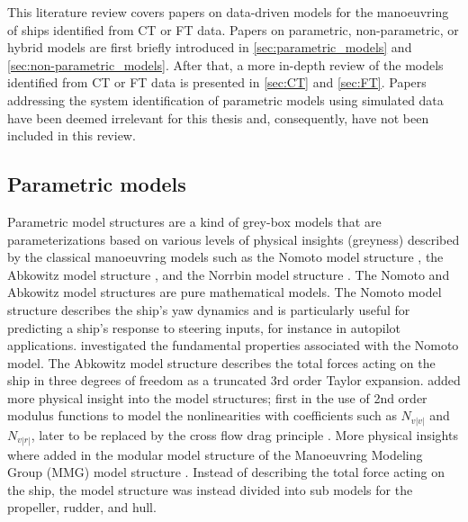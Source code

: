 This literature review covers papers on data-driven models for the manoeuvring of ships identified from CT or FT data. Papers on parametric, non-parametric, or hybrid models are first briefly introduced in \autoref{sec:parametric_models} and \ref{sec:non-parametric_models}. After that, a more in-depth review of the models identified from CT or FT data is presented in \autoref{sec:CT} and \ref{sec:FT}.
Papers addressing the system identification of parametric models using simulated data have been deemed irrelevant for this thesis and, consequently, have not been included in this review.

\subsection{Parametric models} \label{sec:parametric_models}
Parametric model structures are a kind of grey-box models that are parameterizations based on various levels of physical insights (greyness) described by the classical manoeuvring models such as the Nomoto model structure \cite{nomotoSteeringQualitiesShips1957}, the Abkowitz model structure \cite{abkowitzShipHydrodynamicsSteering1964}, and the Norrbin model structure \cite{norrbinTheoryObservationsUse1971}. The Nomoto and Abkowitz model structures are pure mathematical models. The Nomoto model structure describes the ship's yaw dynamics and is particularly useful for predicting a ship's response to steering inputs, for instance in autopilot applications. \textcite{tzengFUNDAMENTALPROPERTIESLINEAR1999} investigated the fundamental properties associated with the Nomoto model. The Abkowitz model structure describes the total forces acting on the ship in three degrees of freedom as a truncated 3rd order Taylor expansion. \textcite{norrbinTheoryObservationsUse1971} added more physical insight into the model structures; first in the use of 2nd order modulus functions  to model the nonlinearities with coefficients such as $N_{v|v|}$ and $N_{v|r|}$, later to be replaced by the cross flow drag principle \cite{fossenHandbookMarineCraft2011}. More physical insights where added in the modular model structure of the Manoeuvring Modeling Group (MMG) model structure \cite{ogawaMathematicalModelManoeuvring1978,inouePracticalCalculationMethod1981,yasukawaIntroductionMMGStandard2015}. Instead of describing the total force acting on the ship, the model structure was instead divided into sub models for the propeller, rudder, and hull.

